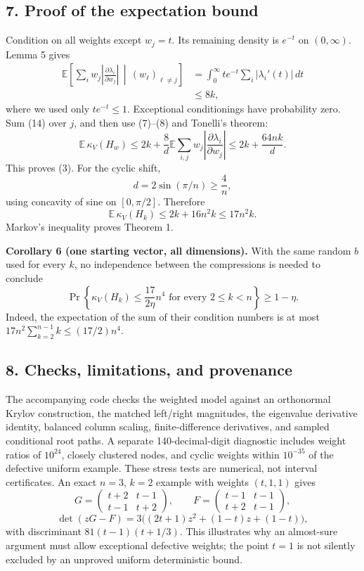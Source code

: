 \documentclass[
  11pt,
]{article}
\begin{document}
\subsection{7. Proof of the expectation
bound}\label{proof-of-the-expectation-bound}

Condition on all weights except \(w_j=t\). Its remaining density is
\(e^{-t}\) on \((0,\infty)\). Lemma 5 gives \[
\begin{aligned}
\mathbb E\left[\sum_iw_j\left|\frac{\partial\lambda_i}{\partial w_j}\right|
\,\middle|\,(w_\ell)_{\ell\ne j}\right]
&=\int_0^\infty t e^{-t}\sum_i|\lambda_i'(t)|\,dt\\
&\leq8k,
\end{aligned} \tag{14}
\] where we used only \(te^{-t}\leq1\). Exceptional conditionings have
probability zero. Sum (14) over \(j\), and then use (7)--(8) and
Tonelli's theorem: \[
\mathbb E\,\kappa_V(H_w)
\leq2k+\frac8d\mathbb E\sum_{i,j}w_j
\left|\frac{\partial\lambda_i}{\partial w_j}\right|
\leq2k+\frac{64nk}{d}.
\] This proves (3). For the cyclic shift, \[
d=2\sin(\pi/n)\geq\frac4n,
\] using concavity of sine on \([0,\pi/2]\). Therefore \[
\mathbb E\,\kappa_V(H_k)\leq2k+16n^2k\leq17n^2k.
\] Markov's inequality proves Theorem 1.

\textbf{Corollary 6 (one starting vector, all dimensions).} With the
same random \(b\) used for every \(k\), no independence between the
compressions is needed to conclude \[
\Pr\left\{\kappa_V(H_k)\leq\frac{17}{2\eta}n^4
\text{ for every }2\leq k<n\right\}\geq1-\eta.
\] Indeed, the expectation of the sum of their condition numbers is at
most \(17n^2\sum_{k=2}^{n-1}k\leq(17/2)n^4\).

\subsection{8. Checks, limitations, and
provenance}\label{checks-limitations-and-provenance}

The accompanying code checks the weighted model against an orthonormal
Krylov construction, the matched left/right magnitudes, the eigenvalue
derivative identity, balanced column scaling, finite-difference
derivatives, and sampled conditional root paths. A separate
140-decimal-digit diagnostic includes weight ratios of \(10^{24}\),
closely clustered nodes, and cyclic weights within \(10^{-35}\) of the
defective uniform example. These stress tests are numerical, not
interval certificates. An exact \(n=3\), \(k=2\) example with weights
\((t,1,1)\) gives \[
G=\begin{pmatrix}t+2&t-1\\t-1&t+2\end{pmatrix},\qquad
F=\begin{pmatrix}t-1&t-1\\t+2&t-1\end{pmatrix},
\] \[
\det(zG-F)=3\big((2t+1)z^2+(1-t)z+(1-t)\big),
\] with discriminant \(81(t-1)(t+1/3)\). This illustrates why an
almost-sure argument must allow exceptional defective weights; the point
\(t=1\) is not silently excluded by an unproved uniform deterministic
bound.
\end{document}
